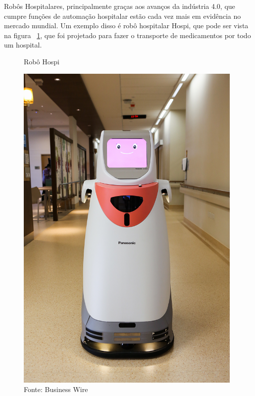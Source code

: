 \documentclass[../poliXuniversity_hospital_-USP-report.tex]{subfiles}
\begin{document}
Robôs Hospitalares, principalmente graças aos avanços da indústria 4.0, que cumpre funções de automação hospitalar estão cada vez mais em evidência no mercado mundial. Um exemplo disso é robô hospitalar Hospi, que pode ser vista na figura ~\ref{fig: Robô Hospi}, que foi projetado para fazer o transporte de medicamentos por todo um hospital. 


\begin{figure}[h]
\centering
    \caption{Robô Hospi}
    \centering %
    \includegraphics[width=11cm]{hospi.jpg}
    \caption*{Fonte: Business Wire}
    \label{fig: Robô Hospi}
\end{figure}
\end{document}
